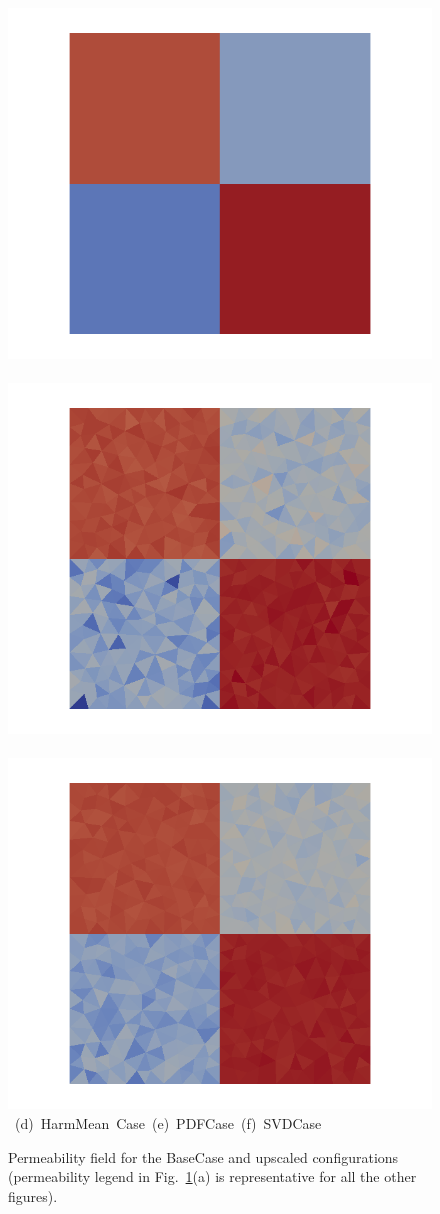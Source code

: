 \begin{landscape}
\begin{figure}[ht]
{\vspace{0.5cm}
\hbox{
      \includegraphics[width=.56\textwidth]{./Pics/HarmMeanCase/HarmMeanCase_PermField_withoutMesh2.png}
      \includegraphics[width=.56\textwidth]{./Pics/PDFCase/PDFCase_PermField_withoutMesh2.png} 
      \includegraphics[width=.56\textwidth]{./Pics/SVDCase/SVDCase_PermField_withoutMesh2.png}}
\vspace{0.cm}
\hbox{ \hspace{1.5cm} (d) HarmMean Case \hspace{4.75cm} (e) PDFCase  \hspace{5.0cm} (f) SVDCase}
\vspace{0.cm}
}   
\caption{Permeability field for the BaseCase and upscaled configurations (permeability legend in Fig.~\ref{fig:PermFields}(a) is representative for all the other figures).}
\label{fig:PermFields}
\end{figure}
\end{landscape}
\clearpage


